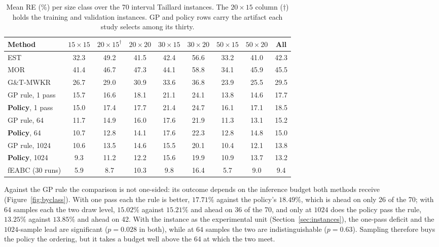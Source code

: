 \documentclass[preprint,authoryear,12pt]{elsarticle}
\theoremstyle{definition}
\theoremstyle{remark}
\begin{document}
\begin{table}[t]
\centering\small
\caption{Mean RE (\%) per size class over the 70 interval Taillard
instances. The $20{\times}15$ column ($\dagger$) holds the training and
validation instances. GP and policy rows carry the artifact each study
selects among its thirty.}
\label{tab:seventy}
\setlength{\tabcolsep}{3.5pt}
\begin{tabular}{lcccccccc}
\toprule
Method & $15{\times}15$ & $20{\times}15^{\dagger}$ & $20{\times}20$ &
$30{\times}15$ & $30{\times}20$ & $50{\times}15$ & $50{\times}20$ &
All \\
\midrule
EST & 32.3 & 49.2 & 41.5 & 42.4 & 56.6 & 33.2 & 41.0 & 42.3 \\
MOR & 41.4 & 46.7 & 47.3 & 44.1 & 58.8 & 34.1 & 45.9 & 45.5 \\
G\&T-MWKR & 26.7 & 29.0 & 30.9 & 33.6 & 36.8 & 23.9 & 25.5 & 29.5 \\
\midrule
GP rule, 1 pass & 15.7 & 16.6 & 18.1 & 21.1 & 24.1 & 13.8 & 14.6 &
17.7 \\
\textbf{Policy}, 1 pass & 15.0 & 17.4 & 17.7 & 21.4 & 24.7 & 16.1 &
17.1 & 18.5 \\
\midrule
GP rule, 64 & 11.7 & 14.9 & 16.0 & 17.6 & 21.9 & 11.3 & 13.1 &
15.2 \\
\textbf{Policy}, 64 & 10.7 & 12.8 & 14.1 & 17.6 & 22.3 & 12.8 &
14.8 & 15.0 \\
\midrule
GP rule, 1024 & 10.6 & 13.5 & 14.6 & 15.5 & 20.1 & 10.4 &
12.1 & 13.8 \\
\textbf{Policy}, 1024 & 9.3 & 11.2 & 12.2 & 15.6 & 19.9 &
10.9 & 13.7 & 13.2 \\
\midrule
fEABC (30 runs) & 5.9 & 8.7 & 10.3 & 9.8 & 16.4 & 5.7 & 9.0 & 9.4 \\
\bottomrule
\end{tabular}
\end{table}


Against the GP rule the comparison is not one-sided: its outcome
depends on the inference budget both methods receive
(Figure~\ref{fig:byclass}). With one pass each the rule is better,
$17.71\%$ against the policy's $18.49\%$, which is ahead on only
26 of the 70; with $64$ samples each the two draw level, $15.02\%$
against $15.21\%$ and ahead on 36 of the 70, and only at $1024$ does
the policy pass the rule, $13.25\%$ against $13.85\%$ and ahead on 42.
With the instance as the experimental unit
(Section~\ref{sec:instances}), the one-pass deficit and the
$1024$-sample lead are significant ($p=0.028$ in both), while at $64$
samples the two are indistinguishable ($p=0.63$). Sampling therefore
buys the policy the ordering, but it takes a budget well above the
$64$ at which the two meet.
\end{document}
